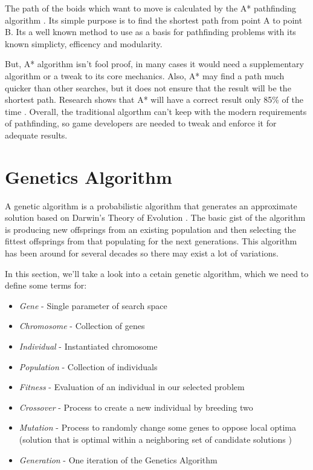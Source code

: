 \documentclass[a4paper, 12pt]{book}
\begin{document}
The path of the boids which want to move is calculated by the A* pathfinding algorithm \cite{FOEAD2021507}. Its simple purpose is to find the shortest path from point A to point B. Its a well known method to use as a basis for pathfinding problems with its known  simplicty, efficency and modularity.

But, A* algorithm isn't fool proof, in many cases it would need a supplementary algorithm or a tweak to its core mechanics. Also, A* may find a path much quicker than other searches, but it does not ensure that the result will be the shortest path. Research shows that A* will have a correct result only 85\% of the time \cite{FOEAD2021507}. Overall, the traditional algorthm can't keep with the modern requirements of pathfinding, so game developers are needed to tweak and enforce it for adequate results.


\section{Genetics Algorithm}

A genetic algorithm is a probabilistic algorithm that generates an approximate solution based on Darwin’s Theory of Evolution \cite{GameAIGeneticAlg}. The basic gist of the algorithm is producing new offsprings from an existing population and then selecting the fittest offsprings from that populating for the next generations. This algorithm has been around for several decades so there may exist a lot of variations.

In this section, we'll take a look into a cetain genetic algorithm, which we need to define some terms for:

\begin{itemize}
    \item \emph{Gene} - Single parameter of search space
    \item \emph{Chromosome} - Collection of genes
    \item \emph{Individual} - Instantiated chromosome
    \item \emph{Population} - Collection of individuals
    \item \emph{Fitness} - Evaluation of an individual in our selected problem
    \item \emph{Crossover} - Process to create a new individual by breeding two
    \item \emph{Mutation} - Process to randomly change some genes to oppose local optima (solution that is optimal within a neighboring set of candidate solutions \cite{LocalOptimum}) 
    \item \emph{Generation} - One iteration of the Genetics Algorithm
\end{itemize}
\end{document}
